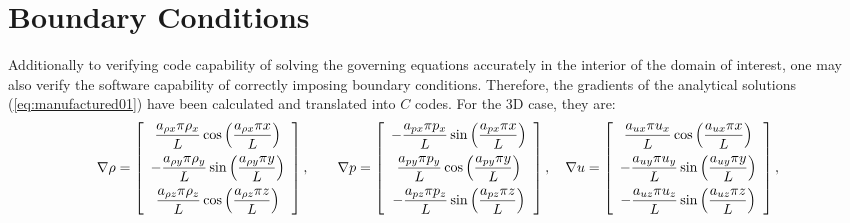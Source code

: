 \documentclass[10pt]{article}
\begin{document}
\section{Boundary Conditions}
Additionally to verifying code capability of solving the governing equations accurately in the interior of the domain of interest, one may also verify the software capability of correctly imposing boundary conditions. Therefore, the gradients of the  analytical solutions (\ref{eq:manufactured01}) have been calculated and translated into $C$ codes. For the 3D case, they are:
\begin{equation*}
\nabla  \rho= \left[ \begin{array}{c}
 \dfrac{  a_{\rho x}  \pi \rho_x}{L} \cos\left( \dfrac{ a_{\rho x}  \pi  x}{L}\right)\vspace{5pt} \\
-\dfrac{  a_{\rho y}  \pi \rho_y}{L} \sin\left( \dfrac{ a_{\rho y}  \pi  y}{L}\right)\vspace{5pt}\\
 \dfrac{  a_{\rho z}  \pi \rho_z}{L}  \cos\left( \dfrac{ a_{\rho z}  \pi  z}{L}\right)
\end{array} \right],
\qquad
\nabla p = \left[ \begin{array}{c}
- \dfrac{  a_{px}  \pi p_x}{L} \sin\left( \dfrac{ a_{px}  \pi  x}{L}\right)\vspace{5pt}\\
  \dfrac{  a_{py}  \pi p_y}{L} \cos\left( \dfrac{ a_{py}  \pi  y}{L}\right) \vspace{5pt}\\
- \dfrac{  a_{pz}  \pi p_z}{L} \sin\left( \dfrac{ a_{pz}  \pi  z}{L}\right)
\end{array} \right],
\quad
\nabla u = \left[ \begin{array}{c}
  \dfrac{  a_{ux}  \pi u_x}{L} \cos\left( \dfrac{ a_{ux}  \pi  x}{L}\right)\vspace{5pt}\\
 -   \dfrac{  a_{uy}  \pi u_y}{L} \sin\left( \dfrac{ a_{uy}  \pi  y}{L}\right)\vspace{5pt}\\
 -   \dfrac{  a_{uz}  \pi u_z}{L} \sin\left( \dfrac{ a_{uz}  \pi  z}{L}\right)
\end{array} \right],
\end{equation*}
\end{document}
